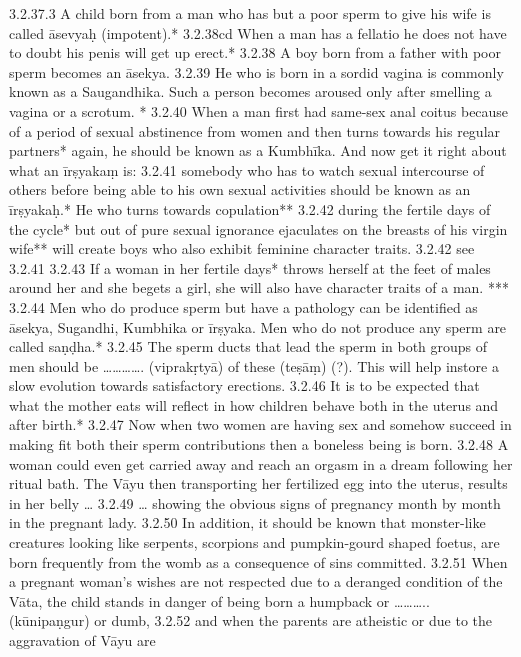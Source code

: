 \begin{translation}
  3.2.37.3  A child born from a man who has but a poor sperm to give his wife is 
  called āsevyaḥ (impotent).*
  3.2.38cd When a man has a fellatio he does not have to doubt his penis will get 
  up erect.*
  3.2.38  A boy born from a father with poor sperm becomes an āsekya.
  3.2.39  He who is born in a sordid vagina is commonly known as a Saugandhika. 
  Such a person becomes aroused only after smelling a vagina or a scrotum. *
  3.2.40  When a man first had same-sex anal coitus because of a period of 
  sexual abstinence from women and then turns towards his regular partners* 
  again, he should be known as a Kumbhīka. And now get it right about what an 
  īrṣyakaṃ is:
  3.2.41  somebody who has to watch sexual intercourse of others before being 
  able to his own sexual activities should be known as an  īrṣyakaḥ.* He who 
  turns towards copulation**
  3.2.42  during the fertile days of the cycle* but out of pure sexual ignorance 
  ejaculates on the breasts of his virgin wife** will create boys who also exhibit 
  feminine character traits.
  3.2.42 see 3.2.41
  3.2.43  If a woman in her fertile days* throws herself at the feet of males 
  around her and she begets a girl, she will also have character traits of a man. 
  *** 
  3.2.44 Men who do produce sperm but have a pathology can be identified as 
  āsekya, Sugandhi, Kumbhika or īrṣyaka. Men who do not produce any sperm 
  are called saṇḍha.*
  3.2.45 The sperm ducts that lead the sperm in both groups of men should be 
  …………. (viprakṛtyā) of these (teṣāṃ) (?). This will help instore a slow evolution 
  towards satisfactory erections. 
  3.2.46  It is to be expected that what the mother eats will reflect in how 
  children behave both in the uterus and after birth.*
  3.2.47  Now when two women are having sex and somehow succeed in making 
  fit both their sperm contributions then a boneless being is born.
  3.2.48 A woman could even get carried away and reach an orgasm in a dream 
  following her ritual bath. The Vāyu then transporting her fertilized egg into the 
  uterus, results in her belly …
  3.2.49  … showing the obvious signs of pregnancy month by month in the 
  pregnant lady.
  3.2.50 In addition, it should be known that monster-like creatures looking like 
  serpents, scorpions and pumpkin-gourd shaped foetus, are born frequently from 
  the womb as a consequence of sins committed.
  3.2.51 When a pregnant woman’s wishes are not respected due to a deranged 
  condition of the Vāta, the child stands in danger of being born a humpback or 
  ……….. (kūnipaṇgur) or dumb,
  3.2.52 and when the parents are atheistic or due to the aggravation of Vāyu are 

\end{translation}
